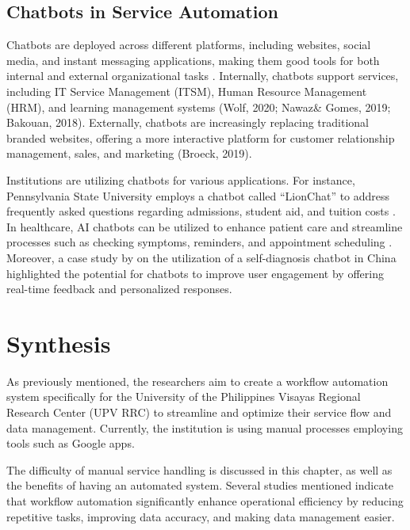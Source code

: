 \subsection{Chatbots in Service Automation}
Chatbots are deployed across different platforms, including websites, social media, and instant messaging applications, making them good tools for both internal and external organizational tasks \cite{hagberg2016, zarouali2018}. Internally, chatbots support services, including IT Service Management (ITSM), Human Resource Management (HRM), and learning management systems (Wolf, 2020; Nawaz\& Gomes, 2019; Bakouan, 2018). Externally, chatbots are increasingly replacing traditional branded websites, offering a more interactive platform for customer relationship management, sales, and marketing (Broeck, 2019).

Institutions are utilizing chatbots for various applications. For instance, Pennsylvania State University employs a chatbot called “LionChat” to address frequently asked questions regarding admissions, student aid, and tuition costs \cite{Pennstate}. In healthcare, AI chatbots can be utilized to enhance patient care and streamline processes such as checking symptoms, reminders, and appointment scheduling \cite{altamimi2023}. Moreover, a case study by \cite{fan2021} on the utilization of a self-diagnosis chatbot in China highlighted the potential for chatbots to improve user engagement by offering real-time feedback and personalized responses.


\section{Synthesis}

As previously mentioned, the researchers aim to create a workflow automation system specifically for the University of the Philippines Visayas Regional Research Center (UPV RRC) to streamline and optimize their service flow and data management. Currently, the institution is using manual processes employing tools such as Google apps.

The difficulty of manual service handling is discussed in this chapter, as well as the benefits of having an automated system. Several studies mentioned indicate that workflow automation significantly enhance operational efficiency by reducing repetitive tasks, improving data accuracy, and making data management easier.

